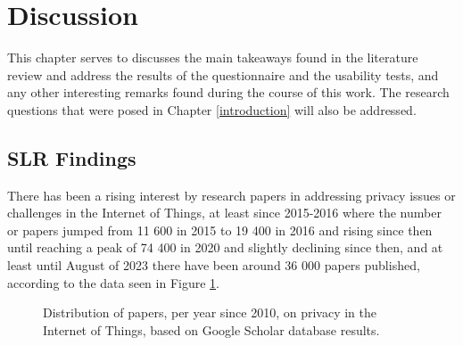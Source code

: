 %
%
\section{Discussion}\label{section:discussion}

\par
This chapter serves to discusses the main takeaways found in the literature
review and address the results of the questionnaire and the usability tests,
and any other interesting remarks found during the course of this work. The
research questions that were posed in Chapter \ref{introduction} will also
be addressed.

\subsection{SLR Findings}

There has been a rising interest by research papers in addressing privacy
issues or challenges in the Internet of Things, at least since 2015-2016
where the number or papers jumped from 11 600 in 2015 to 19 400 in 2016
and rising since then until reaching a peak of 74 400 in 2020 and slightly
declining since then, and at least until August of 2023 there have been
around 36 000 papers published, according to the data seen in Figure \ref{fig:iotprivacy_papers}.

\begin{figure}
    \begin{center}
        \caption{Distribution of papers, per year since 2010, on privacy in the Internet of Things, based on Google Scholar database results.}
        \label{fig:iotprivacy_papers}
    \end{center}
\end{figure}

